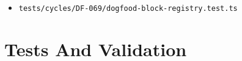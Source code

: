 \begin{itemize}
\begin{itemize}
    \texttt{p\allowbreak{}a\allowbreak{}c\allowbreak{}k\allowbreak{}a\allowbreak{}g\allowbreak{}e\allowbreak{}s\allowbreak{}/\allowbreak{}b\allowbreak{}i\allowbreak{}j\allowbreak{}o\allowbreak{}u\allowbreak{}-\allowbreak{}t\allowbreak{}u\allowbreak{}i\allowbreak{}/\allowbreak{}s\allowbreak{}r\allowbreak{}c\allowbreak{}/\allowbreak{}f\allowbreak{}o\allowbreak{}c\allowbreak{}u\allowbreak{}s\allowbreak{}-\allowbreak{}a\allowbreak{}r\allowbreak{}e\allowbreak{}a\allowbreak{}.\allowbreak{}t\allowbreak{}e\allowbreak{}s\allowbreak{}t\allowbreak{}.\allowbreak{}t\allowbreak{}s}
  \item
    \texttt{t\allowbreak{}e\allowbreak{}s\allowbreak{}t\allowbreak{}s\allowbreak{}/\allowbreak{}c\allowbreak{}y\allowbreak{}c\allowbreak{}l\allowbreak{}e\allowbreak{}s\allowbreak{}/\allowbreak{}D\allowbreak{}F\allowbreak{}-\allowbreak{}0\allowbreak{}6\allowbreak{}9\allowbreak{}/\allowbreak{}d\allowbreak{}o\allowbreak{}g\allowbreak{}f\allowbreak{}o\allowbreak{}o\allowbreak{}d\allowbreak{}-\allowbreak{}b\allowbreak{}l\allowbreak{}o\allowbreak{}c\allowbreak{}k\allowbreak{}-\allowbreak{}r\allowbreak{}e\allowbreak{}g\allowbreak{}i\allowbreak{}s\allowbreak{}t\allowbreak{}r\allowbreak{}y\allowbreak{}.\allowbreak{}t\allowbreak{}e\allowbreak{}s\allowbreak{}t\allowbreak{}.\allowbreak{}t\allowbreak{}s}
  \end{itemize}
\end{itemize}

\section{Tests And Validation}\label{record-243-tests-and-validation}

